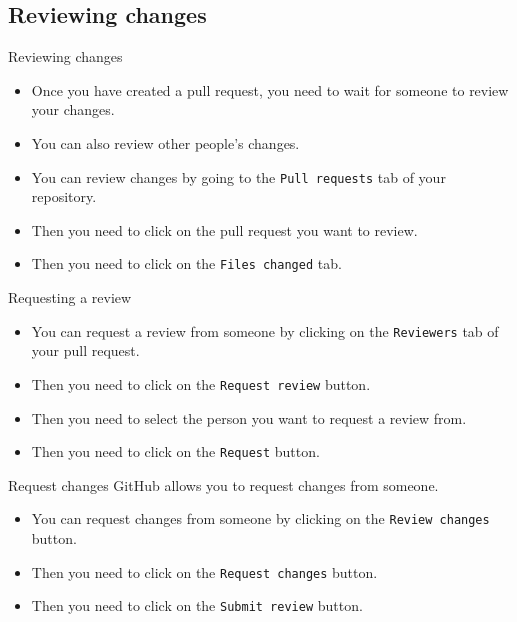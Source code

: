 \documentclass{beamer}
\begin{document}
\subsection{Reviewing changes}

\begin{frame}{Reviewing changes}
    \begin{itemize}
        \item Once you have created a pull request, you need to wait for someone to review your changes.
        \item You can also review other people's changes.
        \item You can review changes by going to the \texttt{Pull requests} tab of your repository.
        \item Then you need to click on the pull request you want to review.
        \item Then you need to click on the \texttt{Files changed} tab.
    \end{itemize}
\end{frame}

\begin{frame}{Requesting a review}
    \begin{itemize}
        \item You can request a review from someone by clicking on the \texttt{Reviewers} tab of your pull request.
        \item Then you need to click on the \texttt{Request review} button.
        \item Then you need to select the person you want to request a review from.
        \item Then you need to click on the \texttt{Request} button.
    \end{itemize}
\end{frame}

\begin{frame}{Request changes}
    GitHub allows you to request changes from someone.
    \begin{itemize}
        \item You can request changes from someone by clicking on the \texttt{Review changes} button.
        \item Then you need to click on the \texttt{Request changes} button.
        \item Then you need to click on the \texttt{Submit review} button.
    \end{itemize}
\end{frame}
\end{document}
